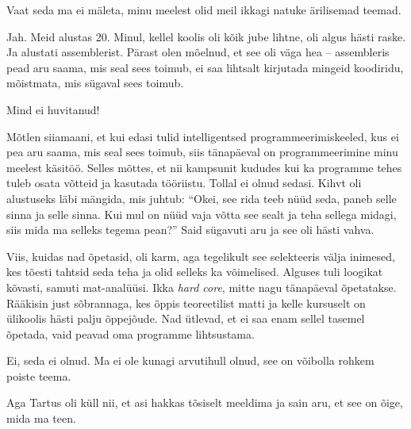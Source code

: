 Vaat seda ma ei mäleta, minu meelest olid meil ikkagi natuke 
ärilisemad teemad.


Jah. Meid alustas 20. Minul, kellel 
koolis oli kõik jube lihtne, oli algus hästi raske. Ja alustati 
assemblerist. Pärast olen mõelnud, et see oli väga hea -- 
assembleris pead aru saama, mis seal 
sees toimub, ei saa lihtsalt kirjutada mingeid koodiridu, mõistmata, mis sügaval sees toimub. 


Mind ei huvitanud!


Mõtlen siiamaani, et kui edasi tulid intelligentsed 
programmeerimiskeeled, kus ei pea aru saama, mis seal sees toimub, siis 
tänapäeval on programmeerimine minu meelest 
käsitöö. Selles mõttes, et nii kampsunit kududes kui ka 
programme tehes tuleb osata võtteid ja kasutada tööriistu. Tollal
ei olnud sedasi. Kihvt oli alustuseks läbi mängida, mis juhtub: 
\enquote{Okei, see rida teeb nüüd seda, paneb selle sinna ja selle sinna. Kui 
mul on nüüd vaja võtta see sealt ja teha sellega midagi, siis mida ma selleks tegema 
pean?} Said sügavuti aru ja see oli hästi vahva. 

Viis, kuidas nad õpetasid, oli karm, aga tegelikult see 
selekteeris välja inimesed, kes tõesti tahtsid seda teha ja olid selleks ka
võimelised. Alguses tuli loogikat kõvasti, samuti mat-analüüsi. Ikka 
\emph{hard core}, mitte nagu tänapäeval õpetatakse. Rääkisin just
sõbrannaga, kes õppis teoreetilist matti ja kelle kursuselt on ülikoolis 
hästi palju õppejõude. Nad ütlevad, et ei saa enam sellel tasemel õpetada, vaid peavad oma 
programme lihtsustama. 


Ei, seda ei olnud. Ma ei ole kunagi arvutihull olnud, see on 
võibolla rohkem poiste teema. 


Aga Tartus oli küll nii, et asi hakkas tõsiselt meeldima ja sain aru, et see 
on õige, mida ma teen. 

